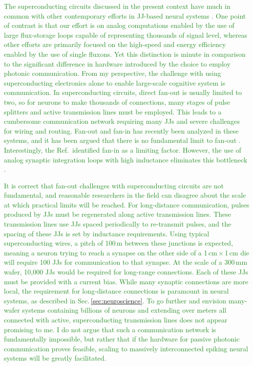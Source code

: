 \documentclass{article}
\begin{document}
\begin{multicols}{2}
\textcolor{ForestGreen}{The superconducting circuits discussed in the present context have much in common with other contemporary efforts in JJ-based neural systems \cite{crsc2010}. One point of contrast is that our effort is on analog computations enabled by the use of large flux-storage loops capable of representing thousands of signal level, whereas other efforts are primarily focused on the high-speed and energy efficiency enabled by the use of single fluxons. Yet this distinction is minute in comparison to the significant difference in hardware introduced by the choice to employ photonic communication. From my perspective, the challenge with using superconducting electronics alone to enable large-scale cognitive system is communication. In superconducting circuits, direct fan-out is usually limited to two, so for neurons to make thousands of connections, many stages of pulse splitters and active transmission lines must be employed. This leads to a cumbersome communication network requiring many JJs and severe challenges for wiring and routing. Fan-out and fan-in has recently been analyzed in these systems, and it has been argued that there is no fundamental limit to fan-out \cite{scse2020}. Interestingly, the Ref.\,\cite{scse2020} identified fan-in as a limiting factor. However, the use of analog synaptic integration loops with high inductance eliminates this bottleneck \cite{sh2019}.}

\textcolor{ForestGreen}{It is correct that fan-out challenges with superconducting circuits are not fundamental, and reasonable researchers in the field can disagree about the scale at which practical limits will be reached. For long-distance communication, pulses produced by JJs must be regenerated along active transmission lines. These transmission lines use JJs spaced periodically to re-transmit pulses, and the spacing of these JJs is set by inductance requirements. Using typical superconducting wires, a pitch of 100\,\textmu m between these junctions is expected, meaning a neuron trying to reach a synapse on the other side of a 1\,cm\,$\times$\,1\,cm die will require 100 JJs for communication to that synapse. At the scale of a 300\,mm wafer, 10,000 JJs would be required for long-range connections. Each of these JJs must be provided with a current bias. While many synaptic connections are more local, the requirement for long-distance connections is paramount in neural systems, as described in Sec.\,\ref{sec:neuroscience}. To go further and envision many-wafer systems containing billions of neurons and extending over meters all connected with active, superconducting transmission lines does not appear promising to me. I do not argue that such a communication network is fundamentally impossible, but rather that if the hardware for passive photonic communication proves feasible, scaling to massively interconnected spiking neural systems will be greatly facilitated.}


\end{multicols}
\end{document}
